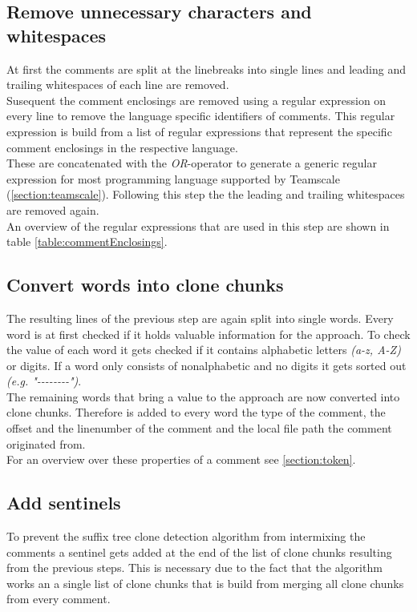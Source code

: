 \subsection{Remove unnecessary characters and whitespaces}
At first the comments are split at the linebreaks into single lines and leading and trailing whitespaces of each line are removed.\\
Susequent the comment enclosings are removed using a regular expression on every line to remove the language specific identifiers of comments. This regular expression is build from a list of regular expressions that represent the specific comment enclosings in the respective language.\\ 
These are concatenated with the \textit{OR}-operator to generate a generic regular expression for most programming language supported by Teamscale (\ref{section:teamscale}). Following this step the the leading and trailing whitespaces are removed again.\\
An overview of the regular expressions that are used in this step are shown in table \ref{table:commentEnclosings}.


\subsection{Convert words into clone chunks}
The resulting lines of the previous step are again split into single words. Every word is at first checked if it holds valuable information for the approach. To check the value of each word it gets checked if it contains alphabetic letters \textit{(a-z, A-Z)} or digits. If a word only consists of nonalphabetic and no digits it gets sorted out \textit{(e.g. "-{}-{}-{}-{}-{}-{}-{}-")}.\\
The remaining words that bring a value to the approach are now converted into clone chunks. Therefore is added to every word the type of the comment, the offset and the linenumber of the comment and the local file path the comment originated from.\\
For an overview over these properties of a comment see \ref{section:token}.

\subsection{Add sentinels}
To prevent the suffix tree clone detection algorithm from intermixing the comments a sentinel gets added at the end of the list of clone chunks resulting from the previous steps. This is necessary due to the fact that the algorithm works an a single list of clone chunks that is build from merging all clone chunks from every comment.


